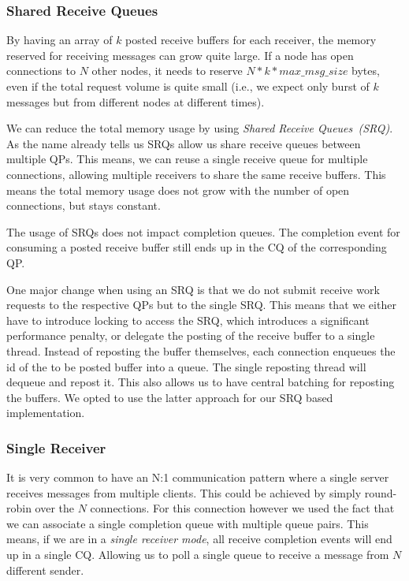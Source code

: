 \subsubsection{Shared Receive Queues} 
By having an array of $k$ posted receive buffers for each receiver, the memory reserved for receiving messages can grow quite
large. If a node has  open connections to $N$ other nodes, it needs to reserve  $N*k*max\_msg\_size$ bytes, even if 
the total request volume is quite small (i.e., we expect only burst of $k$ messages but from different nodes at different times).

We can reduce the total memory usage by using \emph{Shared Receive Queues~(SRQ)}. As the name already tells us SRQs allow us
share receive queues between multiple QPs. This means, we can reuse a single receive queue for multiple connections, allowing
multiple receivers to share the same receive buffers. This means the total memory usage does not grow with the number of
open connections, but stays constant.

The usage of SRQs does not impact completion queues. The completion event for consuming a posted receive buffer still ends up 
in the CQ of the corresponding QP.

One major change when using an SRQ is that we do not submit receive work requests to the respective QPs but to the single SRQ. This
means that we either have to introduce locking to access the SRQ, which introduces a significant performance penalty, or 
delegate the posting of the receive buffer to a single thread. Instead of reposting the buffer themselves, each connection 
enqueues the id of the to be posted buffer into a queue. The single reposting thread will dequeue and repost it. This also
allows us to have central batching for reposting the buffers. We opted to use the latter approach for our SRQ based 
implementation.

\subsubsection{Single Receiver} 
It is very common to have an N:1 communication pattern where a single server receives messages from multiple clients. This
could be achieved by simply round-robin over the $N$ connections. For this connection however we used the fact that we can 
associate a single completion queue with multiple queue pairs. This means, if we are in a \emph{single receiver mode}, all 
receive completion events will end up in a single CQ. Allowing us to poll a single queue to receive a message from $N$ 
different sender.


